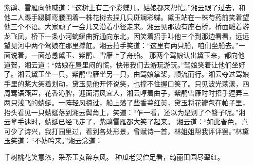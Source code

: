 \documentclass[12pt,oneside]{book}
\begin{document}
紫鹃、雪雁向他喊道：“这树上有三个彩蝶儿，姑娘都来帮忙。”湘云跟了过去，和他二人蹑手蹑脚弯腰围着一株花树去捏几只斑斓彩蝶。黛玉站在一株芍药前笑着望他三个不语。大家顽了一会儿又沿着小径走来。湘云见那边有座石桥，桥面雕着游龙飞凤，桥下一条小河蜿蜒曲折通向东北，因笑着招手叫他三个到那边看看，远远望见河中两个驾娘在那里撑舡。湘云拍手笑道：“这里有两只船，咱们坐船去。”一面说着，一面怂恿黛玉、紫鹃、雪雁上了舟船。
那两个驾娘认出黛玉来，都向他道贺，湘云道：“姑娘在屋里闷的慌，快带我们去游玩游玩。”驾娘笑着让他们坐好了。湘云黛玉坐一只，紫鹃雪雁坐另一只，由驾娘掌桨，顺流而行。湘云夺过驾娘手里的桨大笑着划动，黛玉见他开怀说笑，也撑不住握口笑了。只见波光荡漾，四周莺语燕声，花香沁脾，迎面清风宜人，湘云哼着曲子，紫鹃雪雁时时招手逗弄三两只浅飞的蜻蜓。一阵轻风掠过，船上落了些香萼红英，黛玉将花瓣包在帕子里，抬头看见一只蜻蜓落到湘云鬓角上，笑道：“乍一看，还以为是别了个簪子呢。”湘云拿手逮时，蜻蜓已经飞走了，紫鹃雪雁都大笑了起来。
湘云道：“如此春色，岂可少了诗兴，我打园里过，看到各处形景，曾赋诗一首，林姐姐帮我评评罢。”林黛玉笑道：“不妨吟来。”湘云念道：

千树桃花笑意浓，采茶玉女醉东风。
种瓜老叟伫足看，绮丽田园尽翠红。
\end{document}
